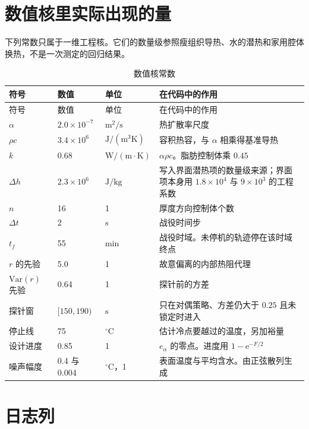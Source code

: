 \section{数值核里实际出现的量}

下列常数只属于一维工程核。它们的数量级参照瘦组织导热、水的潜热和家用腔体换热，不是一次测定的回归结果。

\begin{longtable}{lllp{6.5cm}}
\caption{数值核常数}\\
\toprule
符号 & 数值 & 单位 & 在代码中的作用 \\
\midrule
\endfirsthead
\toprule
符号 & 数值 & 单位 & 在代码中的作用 \\
\midrule
\endhead
\(\alpha\) & \(2.0\times 10^{-7}\) & \(\mathrm{m}^2/\mathrm{s}\) & 热扩散率尺度 \\
\(\rho c\) & \(3.4\times 10^{6}\) & \(\mathrm{J}/(\mathrm{m}^3\mathrm{K})\) & 容积热容，与 \(\alpha\) 相乘得基准导热 \\
\(k\) & \(0.68\) & \(\mathrm{W}/(\mathrm{m\cdot K})\) & \(\alpha\rho c\)。脂肪控制体乘 \(0.45\) \\
\(\Delta h\) & \(2.3\times 10^{6}\) & \(\mathrm{J}/\mathrm{kg}\) & 写入界面潜热项的数量级来源；界面项本身用 \(1.8\times 10^{4}\) 与 \(9\times 10^{3}\) 的工程系数 \\
\(n\) & 16 & 1 & 厚度方向控制体个数 \\
\(\Delta t\) & 2 & \(\mathrm{s}\) & 战役时间步 \\
\(t_f\) & 55 & \(\mathrm{min}\) & 战役时域。未停机的轨迹停在该时域终点 \\
\(r\) 的先验 & 5.0 & 1 & 故意偏离的内部热阻代理 \\
\(\mathrm{Var}(r)\) 先验 & 0.64 & 1 & 探针前的方差 \\
探针窗 & \([150,190)\) & \(\mathrm{s}\) & 只在对偶策略、方差仍大于 \(0.25\) 且未锁定时进入 \\
停止线 & 75 & \(^\circ\mathrm{C}\) & 估计冷点要越过的温度，另加裕量 \\
设计进度 & 0.85 & 1 & \(e_{\alpha}\) 的零点。进度用 \(1-\mathrm{e}^{-F/2}\) \\
噪声幅度 & 0.4 与 0.004 & \(^\circ\mathrm{C}\)，1 & 表面温度与平均含水。由正弦散列生成 \\
\bottomrule
\end{longtable}

\section{日志列}

